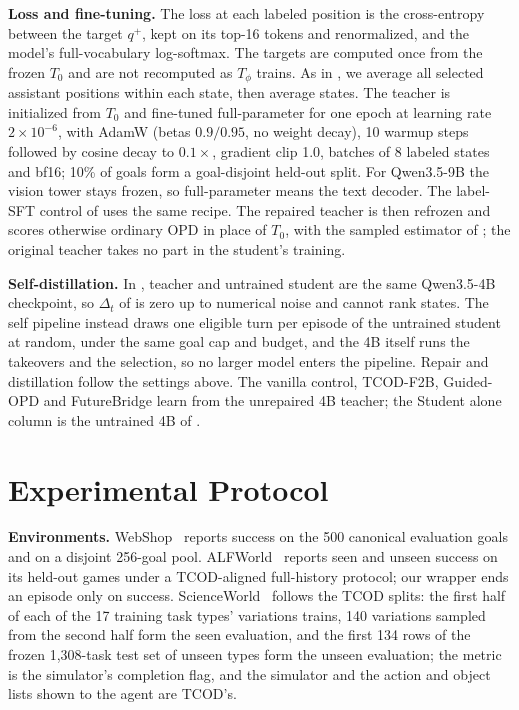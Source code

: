 \textbf{Loss and fine-tuning.} The loss at each labeled position is the cross-entropy between the target $q^+$, kept on its top-16 tokens and renormalized, and the model's full-vocabulary log-softmax. The targets are computed once from the frozen $T_0$ and are not recomputed as $T_\phi$ trains. As in , we average all selected assistant positions within each state, then average states. The teacher is initialized from $T_0$ and fine-tuned full-parameter for one epoch at learning rate $2\times10^{-6}$, with AdamW (betas $0.9/0.95$, no weight decay), 10 warmup steps followed by cosine decay to $0.1\times$, gradient clip 1.0, batches of 8 labeled states and bf16; 10\% of goals form a goal-disjoint held-out split. For Qwen3.5-9B the vision tower stays frozen, so full-parameter means the text decoder. The label-SFT control of  uses the same recipe. The repaired teacher is then refrozen and scores otherwise ordinary OPD in place of $T_0$, with the sampled estimator of ; the original teacher takes no part in the student's training.

\textbf{Self-distillation.} In , teacher and untrained student are the same Qwen3.5-4B checkpoint, so $\Delta_t$ of  is zero up to numerical noise and cannot rank states. The self pipeline instead draws one eligible turn per episode of the untrained student at random, under the same goal cap and budget, and the 4B itself runs the takeovers and the selection, so no larger model enters the pipeline. Repair and distillation follow the settings above. The vanilla control, TCOD-F2B, Guided-OPD and FutureBridge learn from the unrepaired 4B teacher; the Student alone column is the untrained 4B of .

\section{Experimental Protocol}
\label{app:protocol}

\textbf{Environments.} WebShop~\citep{webshop2022} reports success on the 500 canonical evaluation goals and on a disjoint 256-goal pool. ALFWorld~\citep{alfworld2021} reports seen and unseen success on its held-out games under a TCOD-aligned full-history protocol; our wrapper ends an episode only on success. ScienceWorld~\citep{scienceworld2022} follows the TCOD splits: the first half of each of the 17 training task types' variations trains, 140 variations sampled from the second half form the seen evaluation, and the first 134 rows of the frozen 1{,}308-task test set of unseen types form the unseen evaluation; the metric is the simulator's completion flag, and the simulator and the action and object lists shown to the agent are TCOD's.

